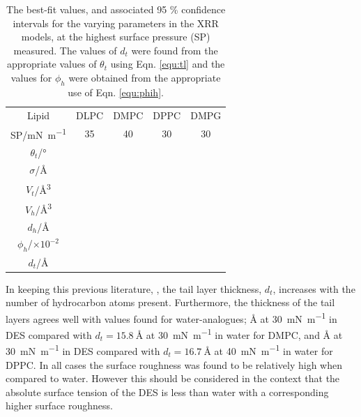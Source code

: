 \documentclass[twocolumn,a4paper]{paper}
\begin{document}
%
\begin{table}
  \centering
	\caption{\label{tab:liptab}\small The best-fit values, and associated 95 \% confidence intervals for the varying parameters in the XRR models, at the highest surface pressure (SP) measured. The values of $d_t$ were found from the appropriate values of $\theta_t$ using Eqn. \ref{equ:tl} and the values for $\phi_h$ were obtained from the appropriate use of Eqn. \ref{equ:phih}.}
	\begin{tabular}{ccccc}
		Lipid & DLPC & DMPC & DPPC & DMPG \\
    SP/\si{\milli\newton\per\meter} & 35 & 40 & 30 & 30 \\
		\hline
		$\theta_t$/\si{\degree} &  &  &  &  \\
		$\sigma$/\si{\angstrom} &  &  &  &  \\
    \hline
    $V_t$/\si{\cubic\angstrom} &  &  &  &  \\
		$V_h$/\si{\cubic\angstrom} &  &  &  &  \\
		$d_h$/\si{\angstrom} &  &  &  &  \\
    \hline
    $\phi_h$/$\times10^{-2}$ &  &  &  &  \\
		$d_t$/\si{\angstrom} &  &  &  &  \\
	\end{tabular}
\end{table}
%

In keeping this previous literature, \cite{Mohwald1990,Vaknin1991}, the tail layer thickness, $d_t$, increases with the number of hydrocarbon atoms present.
Furthermore, the thickness of the tail layers agrees well with values found for water-analogues; \si{\angstrom} at \SI{30}{\milli\newton\per\meter} in DES compared with $d_t=\SI{15.8}{\angstrom}$ at \SI{30}{\milli\newton\per\meter}\cite{Johnson1991} in water for DMPC, and \si{\angstrom} at \SI{30}{\milli\newton\per\meter} in DES compared with $d_t=\SI{16.7}{\angstrom}$ at \SI{40}{\milli\newton\per\meter}\cite{Helm1987} in water for DPPC.
In all cases the surface roughness was found to be relatively high when compared to water. However this should be considered in the context that the absolute surface tension of the DES is less than water with a corresponding higher surface roughness\cite{Arnold2015}.
\end{document}
